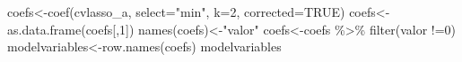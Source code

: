 \documentclass[
]{book}
\newenvironment{Shaded}{\begin{snugshade}}{\end{snugshade}}
\newcommand{\AttributeTok}[1]{\textcolor[rgb]{0.77,0.63,0.00}{#1}}
\newcommand{\ConstantTok}[1]{\textcolor[rgb]{0.00,0.00,0.00}{#1}}
\newcommand{\DecValTok}[1]{\textcolor[rgb]{0.00,0.00,0.81}{#1}}
\newcommand{\FunctionTok}[1]{\textcolor[rgb]{0.00,0.00,0.00}{#1}}
\newcommand{\NormalTok}[1]{#1}
\newcommand{\OtherTok}[1]{\textcolor[rgb]{0.56,0.35,0.01}{#1}}
\newcommand{\SpecialCharTok}[1]{\textcolor[rgb]{0.00,0.00,0.00}{#1}}
\newcommand{\StringTok}[1]{\textcolor[rgb]{0.31,0.60,0.02}{#1}}
\begin{document}
\begin{Shaded}
\begin{Highlighting}[]
\NormalTok{coefs}\OtherTok{\textless{}{-}}\FunctionTok{coef}\NormalTok{(cvlasso\_a, }\AttributeTok{select=}\StringTok{"min"}\NormalTok{, }\AttributeTok{k=}\DecValTok{2}\NormalTok{, }\AttributeTok{corrected=}\ConstantTok{TRUE}\NormalTok{)}
\NormalTok{coefs}\OtherTok{\textless{}{-}}\FunctionTok{as.data.frame}\NormalTok{(coefs[,}\DecValTok{1}\NormalTok{])}
\FunctionTok{names}\NormalTok{(coefs)}\OtherTok{\textless{}{-}}\StringTok{"valor"}
\NormalTok{coefs}\OtherTok{\textless{}{-}}\NormalTok{coefs }\SpecialCharTok{\%\textgreater{}\%} \FunctionTok{filter}\NormalTok{(valor }\SpecialCharTok{!=}\DecValTok{0}\NormalTok{)}
\NormalTok{modelvariables}\OtherTok{\textless{}{-}}\FunctionTok{row.names}\NormalTok{(coefs)}
\NormalTok{modelvariables}
\end{Highlighting}
\end{Shaded}
\end{document}
